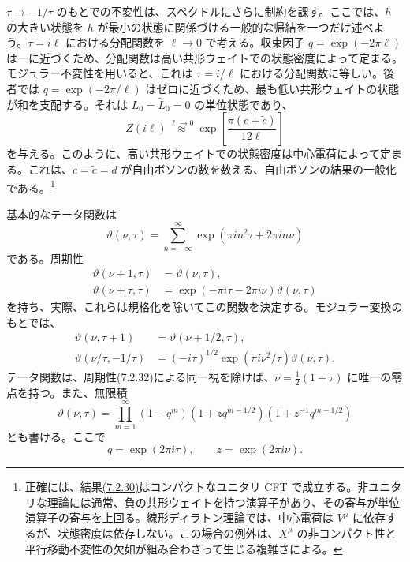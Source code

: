 $\tau\to-1/\tau$ のもとでの不変性は、スペクトルにさらに制約を課す。ここでは、$h$ の大きい状態を $h$ が最小の状態に関係づける一般的な帰結を一つだけ述べよう。$\tau=i\ell$ における分配関数を $\ell\to0$ で考える。収束因子 $q=\exp(-2\pi\ell)$ は一に近づくため、分配関数は高い共形ウェイトでの状態密度によって定まる。モジュラー不変性を用いると、これは $\tau=i/\ell$ における分配関数に等しい。後者では $q=\exp(-2\pi/\ell)$ はゼロに近づくため、最も低い共形ウェイトの状態が和を支配する。それは $L_0=\tilde L_0=0$ の単位状態であり、
\begin{equation}
Z(i\ell)\overset{\ell\to0}{\approx}
\exp\left[\frac{\pi(c+\tilde c)}{12\ell}\right]
\tag{7.2.30}\label{eq:7.2.30}
\end{equation}
を与える。このように、高い共形ウェイトでの状態密度は中心電荷によって定まる。これは、$c=\tilde c=d$ が自由ボソンの数を数える、自由ボソンの結果の一般化である。\footnote[1]{正確には、結果\hyperref[eq:7.2.30]{(7.2.30)}はコンパクトなユニタリ CFT で成立する。非ユニタリな理論には通常、負の共形ウェイトを持つ演算子があり、その寄与が単位演算子の寄与を上回る。線形ディラトン理論では、中心電荷は $V^\mu$ に依存するが、状態密度は依存しない。この場合の例外は、$X^\mu$ の非コンパクト性と平行移動不変性の欠如が組み合わさって生じる複雑さによる。}


基本的なテータ関数は
\begin{equation}
\vartheta(\nu,\tau)
=\sum_{n=-\infty}^{\infty}\exp(\pi in^2\tau+2\pi in\nu)
\tag{7.2.31}\label{eq:7.2.31}
\end{equation}
である。周期性
\begin{align}
\vartheta(\nu+1,\tau)&=\vartheta(\nu,\tau),
\tag{7.2.32a}\label{eq:7.2.32a}\\
\vartheta(\nu+\tau,\tau)&=\exp(-\pi i\tau-2\pi i\nu)\vartheta(\nu,\tau)
\tag{7.2.32b}\label{eq:7.2.32b}
\end{align}
を持ち、実際、これらは規格化を除いてこの関数を決定する。モジュラー変換のもとでは、
\begin{align}
\vartheta(\nu,\tau+1)&=\vartheta(\nu+1/2,\tau),
\tag{7.2.33a}\label{eq:7.2.33a}\\
\vartheta(\nu/\tau,-1/\tau)
&=(-i\tau)^{1/2}\exp(\pi i\nu^2/\tau)\vartheta(\nu,\tau).
\tag{7.2.33b}\label{eq:7.2.33b}
\end{align}
テータ関数は、周期性(7.2.32)による同一視を除けば、$\nu=\tfrac12(1+\tau)$ に唯一の零点を持つ。また、無限積
\begin{equation}
\vartheta(\nu,\tau)
=\prod_{m=1}^{\infty}(1-q^m)(1+zq^{m-1/2})(1+z^{-1}q^{m-1/2})
\tag{7.2.34}\label{eq:7.2.34}
\end{equation}
とも書ける。ここで
\begin{equation}
q=\exp(2\pi i\tau),\qquad z=\exp(2\pi i\nu).
\tag{7.2.35}\label{eq:7.2.35}
\end{equation}

